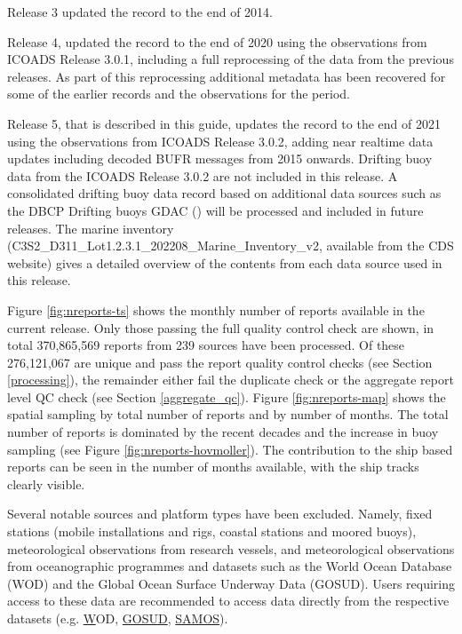 Release 3 updated the record to the end of 2014. 

Release 4, updated the record to the end of 2020 using the observations from ICOADS Release 3.0.1, including a full reprocessing of the data from the previous releases. As part of this reprocessing additional metadata has been recovered for some of the earlier records and the observations for the period.

Release 5, that is described in this guide, updates the record to the end of 2021 using the observations from ICOADS Release 3.0.2, adding near realtime data updates including decoded BUFR messages from 2015 onwards.
Drifting buoy data from the ICOADS Release 3.0.2 are not included in this release.
A consolidated drifting buoy data record based on additional data sources such as the DBCP Drifting buoys GDAC (\cite{DBCP2022,Coriolis2021}) will be processed and included in future releases.
The marine inventory (C3S2\_D311\_Lot1.2.3.1\_202208\_Marine\_Inventory\_v2, available from the CDS website) gives a detailed overview of the contents from each data source used in this release.

Figure \ref{fig:nreports-ts} shows the monthly number of reports available in the current release. 
Only those passing the full quality control check are shown, in total 370,865,569 reports from 239 sources have been processed.
Of these 276,121,067 are unique and pass the report quality control checks (see Section \ref{processing}), the remainder either fail the duplicate check or the aggregate report level QC check (see Section \ref{aggregate_qc}).
Figure \ref{fig:nreports-map} shows the spatial sampling by total number of reports and by number of months. 
The total number of reports is dominated by the recent decades and the increase in buoy sampling (see Figure \ref{fig:nreports-hovmoller}). 
The contribution to the ship based reports can be seen in the number of months available, with the ship tracks clearly visible.

Several notable sources and platform types have been excluded.
Namely, fixed stations (mobile installations and rigs, coastal stations and moored buoys), meteorological observations from research vessels, and meteorological observations from oceanographic programmes and datasets such as the World Ocean Database (WOD) and the Global Ocean Surface Underway Data (GOSUD). 
Users requiring access to these data are recommended to access data directly from the respective datasets (e.g. \href{https://www.ncei.noaa.gov/access/world-ocean-database-select/dbsearch.html} WOD, \href{http://www.gosud.org/}{GOSUD}, \href{https://samos.coaps.fsu.edu/html/nav.php?s=2}{SAMOS}).

